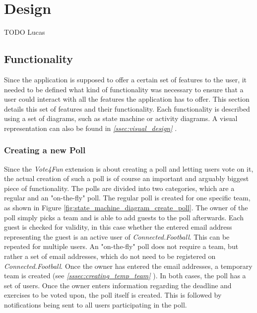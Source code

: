 \section{Design}
\label{sec:desgin}

TODO Lucas

\subsection{Functionality}
\label{ssec:functionality}

Since the application is supposed to offer a certain set of features to the user, it needed to be defined what kind of functionality was necessary to ensure that a user could interact with all the features the application has to offer. This section details this set of features and their functionality.
\newline
Each functionality is described using a set of diagrams, such as state machine or activity diagrams. A visual representation can also be found in \textit{\ref{ssec:visual_design} }.

\subsubsection{Creating a new Poll}
\label{sssec:creating_a_new_poll}

Since the \textit{Vote4Fun} extension is about creating a poll and letting users vote on it, the actual creation of such a poll is of course an important and arguably biggest piece of functionality. The polls are divided into two categories, which are a regular and an "on-the-fly" poll.
\newline
The regular poll is created for one specific team, as shown in Figure \ref{fig:state_machine_diagram_create_poll}. The owner of the poll simply picks a team and is able to add guests to the poll afterwards. Each guest is checked for validity, in this case whether the entered email address representing the guest is an active user of \textit{Connected.Football}. This can be repeated for multiple users. An "on-the-fly" poll does not require a team, but rather a set of email addresses, which do not need to be registered on \textit{Connected.Football}. Once the owner has entered the email addresses, a temporary team is created (see \textit{\ref{sssec:creating_temp_team} }).
\newline
In both cases, the poll has a set of users. Once the owner enters information regarding the deadline and exercises to be voted upon, the poll itself is created. This is followed by notifications being sent to all users participating in the poll.


